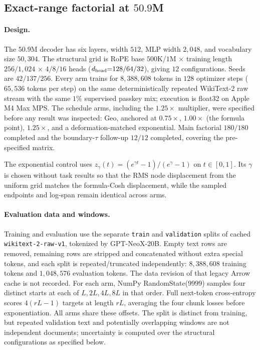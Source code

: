 \FloatBarrier
\subsection{Exact-range factorial at \texorpdfstring{$50.9$M}{50.9M}}
\label{sec:exact-range-factorial}

\paragraph{Design.} The $50.9$M decoder has six layers, width $512$, MLP width
$2{,}048$, and vocabulary size $50{,}304$. The structural grid is RoPE base
$500$K/$1$M $\times$ training length $256/1{,}024$ $\times$ $4/8/16$ heads
($d_{\rm head}{=}128/64/32$), giving $12$ configurations. Seeds are
$42/137/256$. Every arm trains for $8{,}388{,}608$ tokens in $128$ optimizer
steps ($65{,}536$ tokens per step) on the same deterministically repeated
WikiText-2 raw stream with the same $1\%$ supervised passkey mix; execution is
float32 on Apple M4 Max MPS. The schedule arms, including the $1.25\times$
multiplier, were specified before any result was inspected: Geo, anchored
\evq{} at $0.75\times$, $1.00\times$ (the formula point), $1.25\times$, and a
deformation-matched exponential. Main factorial $180/180$ completed and the
boundary-$\tau$ follow-up $12/12$ completed, covering the pre-specified matrix.

The exponential control uses
$z_\gamma(t)=(e^{\gamma t}-1)/(e^\gamma-1)$ on $t\in[0,1]$. Its $\gamma$ is
chosen without task results so that the RMS node displacement from the uniform
grid matches the formula-Cosh displacement, while the sampled endpoints and
log-span remain identical across arms.

\paragraph{Evaluation data and windows.}
Training and evaluation use the separate \texttt{train} and \texttt{validation} splits of cached \texttt{wikitext-2-raw-v1}, tokenized by GPT-NeoX-20B. Empty text rows are removed, remaining rows are stripped and concatenated without extra special tokens, and each split is repeated/truncated independently: $8{,}388{,}608$ training tokens and $1{,}048{,}576$ evaluation tokens. The data revision of that legacy Arrow cache is not recorded. For each arm, NumPy RandomState($9999$) samples four distinct starts at each of $L,2L,4L,8L$ in that order. Full next-token cross-entropy scores $4(rL-1)$ targets at length $rL$, averaging the four chunk losses before exponentiation. All arms share these offsets. The split is distinct from training, but repeated validation text and potentially overlapping windows are not independent documents; uncertainty is computed over the structural configurations as specified below.

